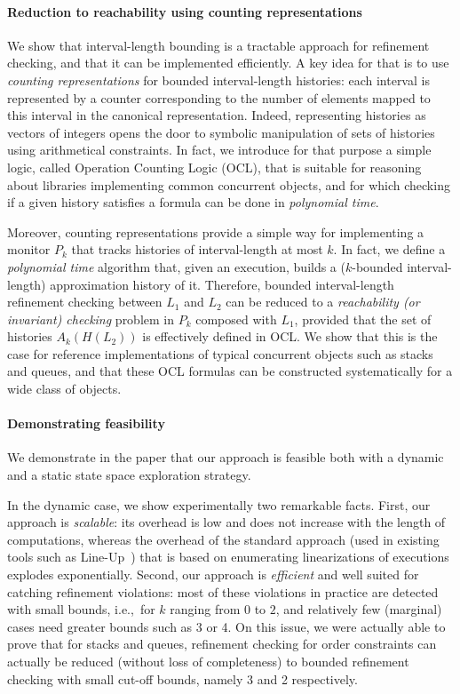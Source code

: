 \paragraph{Reduction to reachability using counting representations}

We show that interval-length bounding is a tractable approach for refinement
checking, and that it can be implemented efficiently. A key idea for that is to
use \emph{counting representations} for bounded interval-length histories: each
interval is represented by a counter corresponding to the number of elements
mapped to this interval in the canonical representation. Indeed, representing
histories as vectors of integers opens the door to symbolic manipulation of
sets of histories using arithmetical constraints. In fact, we introduce for
that purpose a simple logic, called Operation Counting Logic (OCL), that is
suitable for reasoning about libraries implementing common concurrent objects,
and for which checking if a given history satisfies a formula can be done in
\emph{polynomial time}.

Moreover, counting representations provide a simple way for implementing a
monitor $P_k$ that tracks histories of interval-length at most $k$. In fact, we
define a \emph{polynomial time} algorithm that, given an execution, builds a
($k$-bounded interval-length) approximation history of it. Therefore, bounded
interval-length refinement checking between $L_1$ and $L_2$ can be reduced to a
\emph{reachability (or invariant) checking} problem in $P_k$ composed with
$L_1$, provided that the set of histories $A_k(H(L_2))$ is effectively defined
in OCL. We show that this is the case for reference implementations of typical
concurrent objects such as stacks and queues, and that these OCL formulas can
be constructed systematically for a wide class of objects.

\paragraph{Demonstrating feasibility}

We demonstrate in the paper that our approach is feasible both with a dynamic
and a static state space exploration strategy.

In the dynamic case, we show experimentally two remarkable facts. First, our
approach is \emph{scalable}: its overhead is low and does not increase with the
length of computations, whereas the overhead of the standard approach (used in
existing tools such as Line-Up~\cite{conf/pldi/BurckhardtDMT10}) that is based
on enumerating linearizations of executions explodes exponentially. Second, our
approach is \emph{efficient} and well suited for catching refinement
violations: most of these violations in practice are detected with small
bounds, i.e.,~for $k$ ranging from 0 to $2$, and relatively few (marginal)
cases need greater bounds such as 3 or 4. On this issue, we were actually able
to prove that for stacks and queues, refinement checking for order constraints
can actually be reduced (without loss of completeness) to bounded refinement
checking with small cut-off bounds, namely 3 and 2 respectively.

